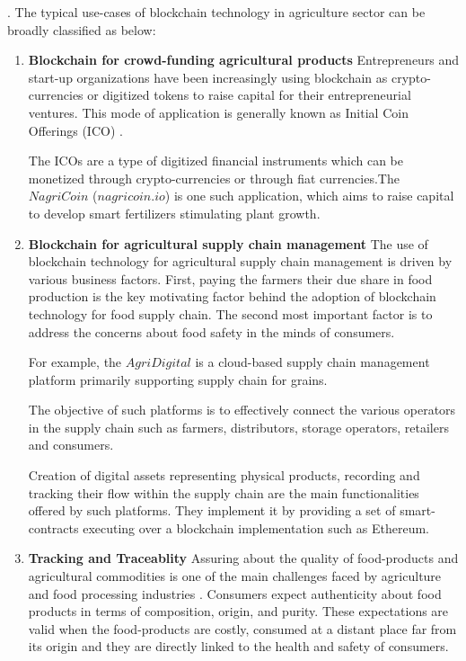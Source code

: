 \documentclass[10pt]{IETBook}
\begin{document}
 .
The typical use-cases of blockchain technology in agriculture sector can be broadly classified as below:
\begin{enumerate}
    \item {\bf Blockchain for crowd-funding agricultural products} Entrepreneurs and  start-up organizations have been increasingly using blockchain as  crypto-currencies or  digitized tokens  to raise capital for their entrepreneurial ventures. This mode of application is generally known as Initial Coin Offerings (ICO) \cite{catalini2018initial}. 
    
    The ICOs are a type of digitized financial instruments which can be monetized through crypto-currencies or through fiat currencies.The $NagriCoin$ ($nagricoin.io$) is one such  application, which aims to raise capital to develop smart fertilizers stimulating plant growth. 
    
    \item {\bf Blockchain for agricultural supply chain management}  The use of blockchain technology for agricultural supply chain management is driven by various business factors.  First, paying the farmers their due share in food production is the key motivating factor behind the adoption of blockchain technology for food supply chain. The second most important factor is to address the  concerns about food safety in the minds of consumers. 
    
    For example, the $AgriDigital$ is a cloud-based supply chain management platform primarily supporting supply chain for grains. 
    
    The objective of such platforms is to effectively connect the various operators in the supply chain such as farmers, distributors, storage operators, retailers and consumers. 
    
    Creation of digital assets representing physical products, recording and tracking their flow within the supply chain are the main functionalities offered by  such platforms. They implement it by providing a set of smart-contracts executing over a blockchain implementation such as Ethereum.
    
  
    
    \item {\bf Tracking and Traceablity}
     Assuring about the quality of food-products and agricultural commodities is one of the main challenges faced by agriculture and food processing industries \cite{kamilaris2019rise}. Consumers expect authenticity about food products in terms of composition, origin, and purity.
    These expectations are valid when the food-products are costly, consumed at a distant place far from its origin and they are directly linked to the health and safety of consumers.
    

\end{enumerate}
\end{document}
